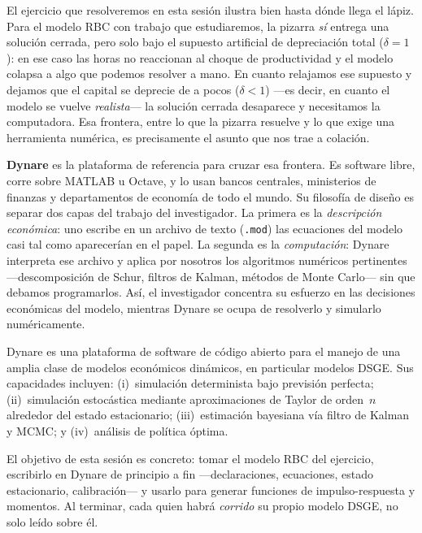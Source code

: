 \documentclass[11pt,a4paper]{report}
\newcounter{tcbdef}[section]
\renewcommand{\thetcbdef}{\thesection.\arabic{tcbdef}}
\newenvironment{definition}[1][]{%
  \refstepcounter{tcbdef}%
  \begin{tcolorbox}[defstyle, title={Definición~\thetcbdef%
    \ifx\relax#1\relax\else\ (#1)\fi}]}%
{\end{tcolorbox}}
\newcounter{ejer}
\newcommand{\code}[1]{\texttt{#1}}
\begin{document}
El ejercicio que resolveremos en esta sesión ilustra bien hasta dónde llega el
lápiz. Para el modelo RBC con trabajo que estudiaremos, la pizarra \emph{sí}
entrega una solución cerrada, pero solo bajo el supuesto artificial de
depreciación total ($\delta=1$): en ese caso las horas no reaccionan al choque
de productividad y el modelo colapsa a algo que podemos resolver a mano. En
cuanto relajamos ese supuesto y dejamos que el capital se deprecie de a pocos
($\delta<1$) ---es decir, en cuanto el modelo se vuelve \emph{realista}--- la
solución cerrada desaparece y necesitamos la computadora. Esa frontera, entre
lo que la pizarra resuelve y lo que exige una herramienta numérica, es
precisamente el asunto que nos trae a colación.

\textbf{Dynare} es la plataforma de referencia para cruzar esa frontera. Es
software libre, corre sobre MATLAB u Octave, y lo usan bancos centrales,
ministerios de finanzas y departamentos de economía de todo el mundo. Su
filosofía de diseño es separar dos capas del trabajo del investigador. La
primera es la \emph{descripción económica}: uno escribe en un archivo de texto
(\code{.mod}) las ecuaciones del modelo casi tal como aparecerían en el papel.
La segunda es la \emph{computación}: Dynare interpreta ese archivo y aplica por
nosotros los algoritmos numéricos pertinentes ---descomposición de Schur,
filtros de Kalman, métodos de Monte Carlo--- sin que debamos programarlos. Así,
el investigador concentra su esfuerzo en las decisiones económicas del modelo,
mientras Dynare se ocupa de resolverlo y simularlo numéricamente.

\begin{definition}[Dynare]
Dynare es una plataforma de software de código abierto para el manejo de una
amplia clase de modelos económicos dinámicos, en particular modelos DSGE. Sus
capacidades incluyen: (i)~simulación determinista bajo previsión perfecta;
(ii)~simulación estocástica mediante aproximaciones de Taylor de orden~$n$
alrededor del estado estacionario; (iii)~estimación bayesiana vía filtro de
Kalman y MCMC; y (iv)~análisis de política óptima.
\end{definition}

El objetivo de esta sesión es concreto: tomar el modelo RBC del ejercicio,
escribirlo en Dynare de principio a fin ---declaraciones, ecuaciones, estado
estacionario, calibración--- y usarlo para generar funciones de
impulso-respuesta y momentos. Al terminar, cada quien habrá \emph{corrido} su
propio modelo DSGE, no solo leído sobre él.
\end{document}
